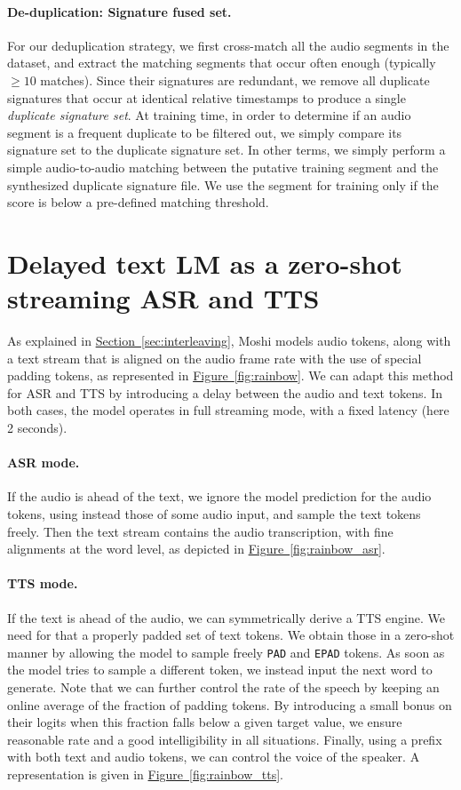 \paragraph{De-duplication: Signature fused set.} 
For our deduplication strategy, we first cross-match all the audio segments in the dataset, and extract the matching segments that occur often enough (typically $\geq 10$ matches). Since their signatures are redundant, we remove all duplicate signatures that occur at identical relative timestamps to produce a single \emph{duplicate signature set}. At training time, in order to determine if an audio segment is a frequent duplicate to be filtered out, we simply compare its signature set to the duplicate signature set. In other terms, we simply perform  a simple audio-to-audio matching between the putative training segment and the synthesized duplicate signature file. We use the segment for training only if the score is below a pre-defined matching threshold. 


\section{Delayed text LM as a zero-shot streaming ASR and TTS}
\label{app:streaming_tts}
As explained in \hyperref[sec:interleaving]{Section~\ref{sec:interleaving}}, Moshi models audio tokens, along
with a text stream that is aligned on the audio frame rate with the use of special padding tokens, as represented in \hyperref[fig:rainbow]{Figure~\ref{fig:rainbow}}. We can adapt this method for ASR and TTS by introducing a delay between the audio and text tokens. In both cases, the model operates in full streaming mode, with a fixed latency (here 2 seconds).
    
\paragraph{ASR mode.} If the audio is ahead of the text, we ignore the model prediction for the audio tokens, using instead those of some audio input, and sample the text tokens freely. Then the text stream contains the audio transcription, with fine alignments at the word level, as depicted in \hyperref[fig:rainbow_asr]{Figure~\ref{fig:rainbow_asr}}.
\paragraph{TTS mode.} If the text is ahead of the audio, we can symmetrically derive a TTS engine. We need for that a properly padded set of text tokens. We obtain those in a zero-shot manner by allowing the model to sample freely \texttt{PAD} and \texttt{EPAD} tokens. As soon as the model tries to sample a different token, we instead input the next word to generate. Note that we can further control the rate of the speech by keeping an online average of the fraction of padding tokens. By introducing a small bonus on their logits when this fraction falls below a given target value, we ensure reasonable rate and a good intelligibility in all situations. Finally, using a prefix with both text and audio tokens, we can control the voice of the speaker. A representation is given in \hyperref[fig:rainbow_tts]{Figure~\ref{fig:rainbow_tts}}.
